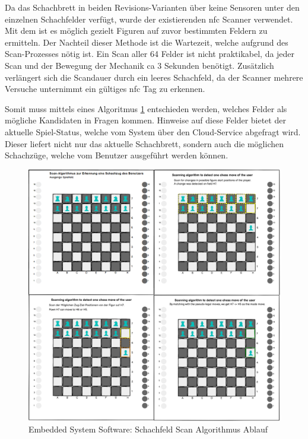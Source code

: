 Da das Schachbrett in beiden Revisions-Varianten über keine Sensoren
unter den einzelnen Schachfelder verfügt, wurde der existierenden
\gls{nfc} Scanner verwendet. Mit dem ist es möglich gezielt Figuren auf
zuvor bestimmten Feldern zu ermitteln. Der Nachteil dieser Methode ist
die Wartezeit, welche aufgrund des Scan-Prozesses nötig ist. Ein Scan
aller 64 Felder ist nicht praktikabel, da jeder Scan und der Bewegung
der Mechanik ca 3 Sekunden benötigt. Zusätzlich verlängert sich die
Scandauer durch ein leeres Schachfeld, da der Scanner mehrere Versuche
unternimmt ein gültiges \gls{nfc} Tag zu erkennen.

Somit muss mittels eines Algoritmus \ref{ATC_ChessMoveAlgorithm}
entschieden werden, welches Felder als mögliche Kandidaten in Fragen
kommen. Hinweise auf diese Felder bietet der aktuelle Spiel-Status,
welche vom System über den Cloud-Service abgefragt wird. Dieser liefert
nicht nur das aktuelle Schachbrett, sondern auch die möglichen
Schachzüge, welche vom Benutzer ausgeführt werden können.

\begin{figure}
\centering
\includegraphics{images/ATC_ChessMoveAlgorithm.png}
\caption{Embedded System Software: Schachfeld Scan Algorithmus Ablauf
\label{ATC_ChessMoveAlgorithm}}
\end{figure}

